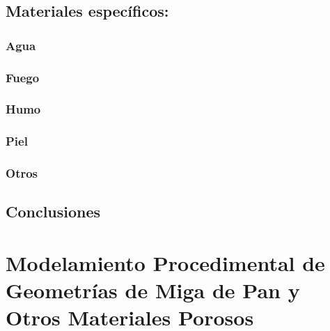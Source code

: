 \documentclass[spanish,a4paper,openright,11pt]{book}
\begin{document}
\section{Materiales específicos:}
\subsection{Agua}
\subsection{Fuego}
\subsection{Humo}
\subsection{Piel}
\subsection{Otros}


\section{Conclusiones}


\chapter{Modelamiento Procedimental de Geometrías de Miga de Pan y Otros Materiales Porosos}
\end{document}
